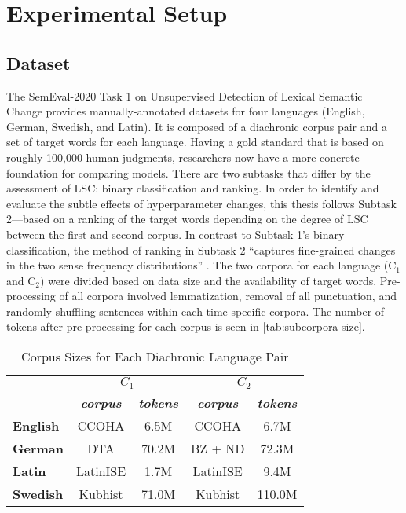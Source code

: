\section{Experimental Setup}
\label{sec:exp-setup}

\subsection{Dataset}

The SemEval-2020 Task 1 on Unsupervised Detection of Lexical Semantic Change \citep{schlechtweg-etal-2020-semeval} provides manually-annotated datasets for four languages (English, German, Swedish, and Latin). It is composed of a diachronic corpus pair and a set of target words for each language. Having a gold standard that is based on roughly 100,000 human judgments, researchers now have a more concrete foundation for comparing models. There are two subtasks that differ by the assessment of LSC: binary classification and ranking. In order to identify and evaluate the subtle effects of hyperparameter changes, this thesis follows Subtask 2—based on a ranking of the target words depending on the degree of LSC between the first and second corpus. In contrast to Subtask 1’s binary classification, the method of ranking in Subtask 2 “captures fine-grained changes in the two sense frequency distributions” \citep{schlechtweg-etal-2020-semeval}. The two corpora for each language (C$_1$ and C$_2$) were divided based on data size and the availability of target words. Pre-processing of all corpora involved lemmatization, removal of all punctuation, and randomly shuffling sentences within each time-specific corpora. The number of tokens after pre-processing for each corpus is seen in \autoref{tab:subcorpora-size}.

\begin{table}[h]
\centering
\begin{tabular}{|l|cc|cc|} 
\cline{2-5}
\multicolumn{1}{l|}{\textbf{}} & \multicolumn{2}{c|}{\textbf{$C_1$}}                 & \multicolumn{2}{c|}{\textbf{$C_2$}}                  \\
\multicolumn{1}{l|}{}          & \textit{\textbf{corpus}} & \textit{\textbf{tokens}} & \textit{\textbf{corpus}} & \textit{\textbf{tokens}}  \\ 
\hline
\textbf{English}               & CCOHA                    & 6.5M                     & CCOHA                    & 6.7M                      \\ 
\hline
\textbf{German}                & DTA                      & 70.2M                    & BZ + ND                  & 72.3M                     \\ 
\hline
\textbf{Latin}                 & LatinISE                 & 1.7M                     & LatinISE                 & 9.4M                      \\ 
\hline
\textbf{Swedish}               & Kubhist                  & 71.0M                    & Kubhist                  & 110.0M                    \\
\hline
\end{tabular}
\caption{Corpus Sizes for Each Diachronic Language Pair}
\label{tab:subcorpora-size}
\end{table}

